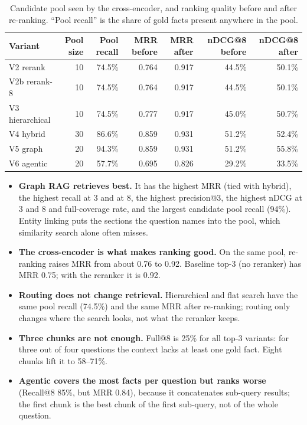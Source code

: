 \documentclass[11pt,a4paper]{article}
\begin{document}
\begin{table}[h]\centering\footnotesize
\caption{Candidate pool seen by the cross-encoder, and ranking quality before and after re-ranking. ``Pool recall'' is the share of gold facts present anywhere in the pool.}
\begin{tabular}{@{}lrrrrrr@{}}\toprule
Variant & Pool size & Pool recall & MRR before & MRR after & nDCG@8 before & nDCG@8 after\\\midrule
V2 rerank & 10 & 74.5\% & 0.764 & 0.917 & 44.5\% & 50.1\% \\
V2b rerank-8 & 10 & 74.5\% & 0.764 & 0.917 & 44.5\% & 50.1\% \\
V3 hierarchical & 10 & 74.5\% & 0.777 & 0.917 & 45.0\% & 50.7\% \\
V4 hybrid & 30 & 86.6\% & 0.859 & 0.931 & 51.2\% & 52.4\% \\
V5 graph & 20 & 94.3\% & 0.859 & 0.931 & 51.2\% & 55.8\% \\
V6 agentic & 20 & 57.7\% & 0.695 & 0.826 & 29.2\% & 33.5\% \\
\bottomrule\end{tabular}
\end{table}

\begin{itemize}
\item \textbf{Graph RAG retrieves best.} It has the highest MRR (tied with hybrid), the highest recall at 3 and at 8, the highest precision@3, the highest nDCG at 3 and 8 and full-coverage rate, and the largest candidate pool recall (94\%). Entity linking puts the sections the question names into the pool, which similarity search alone often misses.
\item \textbf{The cross-encoder is what makes ranking good.} On the same pool, re-ranking raises MRR from about 0.76 to 0.92. Baseline top-3 (no reranker) has MRR 0.75; with the reranker it is 0.92.
\item \textbf{Routing does not change retrieval.} Hierarchical and flat search have the same pool recall (74.5\%) and the same MRR after re-ranking; routing only changes where the search looks, not what the reranker keeps.
\item \textbf{Three chunks are not enough.} Full@8 is 25\% for all top-3 variants: for three out of four questions the context lacks at least one gold fact. Eight chunks lift it to 58--71\%.
\item \textbf{Agentic covers the most facts per question but ranks worse} (Recall@8 85\%, but MRR 0.84), because it concatenates sub-query results; the first chunk is the best chunk of the first sub-query, not of the whole question.
\end{itemize}
\end{document}
